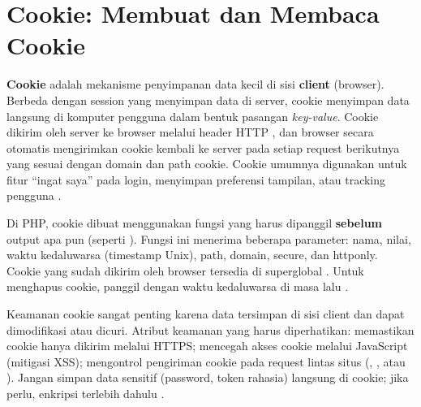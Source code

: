 \section{Cookie: Membuat dan Membaca Cookie}

\textbf{Cookie} adalah mekanisme penyimpanan data kecil di sisi \textbf{client} (browser). Berbeda dengan session yang menyimpan data di server, cookie menyimpan data langsung di komputer pengguna dalam bentuk pasangan \textit{key-value}. Cookie dikirim oleh server ke browser melalui header HTTP , dan browser secara otomatis mengirimkan cookie kembali ke server pada setiap request berikutnya yang sesuai dengan domain dan path cookie. Cookie umumnya digunakan untuk fitur ``ingat saya'' pada login, menyimpan preferensi tampilan, atau tracking pengguna \cite{phpManual}.

Di PHP, cookie dibuat menggunakan fungsi  yang harus dipanggil \textbf{sebelum} output apa pun (seperti ). Fungsi ini menerima beberapa parameter: nama, nilai, waktu kedaluwarsa (timestamp Unix), path, domain, secure, dan httponly. Cookie yang sudah dikirim oleh browser tersedia di superglobal . Untuk menghapus cookie, panggil  dengan waktu kedaluwarsa di masa lalu \cite{phpRightWay}.


Keamanan cookie sangat penting karena data tersimpan di sisi client dan dapat dimodifikasi atau dicuri. Atribut keamanan yang harus diperhatikan:  memastikan cookie hanya dikirim melalui HTTPS;  mencegah akses cookie melalui JavaScript (mitigasi XSS);  mengontrol pengiriman cookie pada request lintas situs (, , atau ). Jangan simpan data sensitif (password, token rahasia) langsung di cookie; jika perlu, enkripsi terlebih dahulu \cite{owaspXss}.

